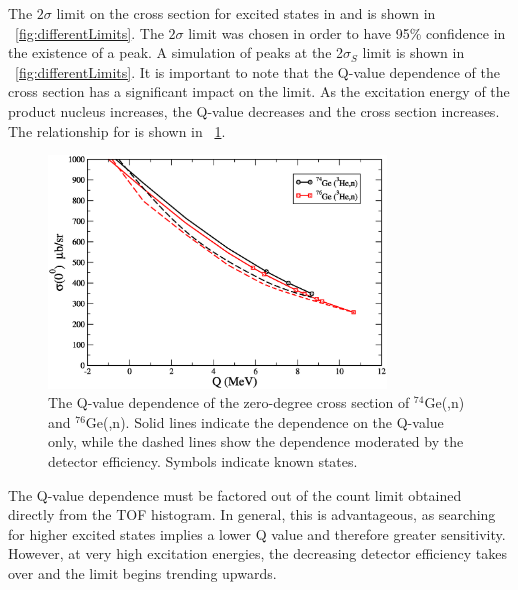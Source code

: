 The $2\sigma$ limit on the cross section for excited \zp states in  and  is shown in {\fig}~\ref{fig:differentLimits}.  The $2\sigma$ limit was chosen in order to have 95\% confidence in the existence of a peak.  A simulation of peaks at the 2$\sigma_S$ limit is shown in {\fig}~\ref{fig:differentLimits}.  It is important to note that the Q-value dependence of the cross section has a significant impact on the limit.  As the excitation energy of the product nucleus increases, the Q-value decreases and the cross section increases.  The relationship for \reaction is shown in {\fig}~\ref{fig:QvalDependence}.
\begin{figure}[!htbp]
\centering
\includegraphics[width=0.8\textwidth]{figures/SigmaVsQ.eps}
\caption{The Q-value dependence of the zero-degree cross section of $^{74}$Ge(,n) and $^{76}$Ge(,n).  Solid lines indicate the dependence on the Q-value only, while the dashed lines show the dependence moderated by the detector efficiency.  Symbols indicate known \zp states.}
\label{fig:QvalDependence}
\end{figure}
The Q-value dependence must be factored out of the count limit obtained directly from the TOF histogram.  In general, this is advantageous, as searching for higher excited \zp states implies a lower Q value and therefore greater sensitivity.  However, at very high excitation energies, the decreasing detector efficiency takes over and the limit begins trending upwards.

